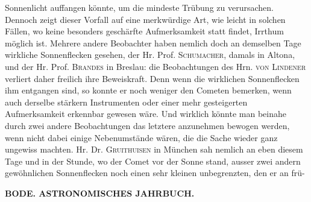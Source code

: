 Sonnenlicht auffangen könnte, um die mindeste Trübung zu verursachen. Dennoch zeigt dieser Vorfall auf eine merkwürdige Art, wie leicht in solchen Fällen, wo keine besonders geschärfte Aufmerksamkeit statt findet, Irrthum möglich ist. Mehrere andere Beobachter haben nemlich doch an demselben Tage wirkliche Sonnenflecken gesehen, der Hr. Prof. \textsc{Schumacher}, damals in Altona, und der Hr. Prof. \textsc{Brandes} in Breslau: die Beobachtungen des Hrn. \textsc{von Lindener} verliert daher freilich ihre Beweiskraft. Denn wenn die wirklichen Sonnenflecken ihm entgangen sind, so konnte er noch weniger den Cometen bemerken, wenn auch derselbe stärkern Instrumenten oder einer mehr gesteigerten Aufmerksamkeit erkennbar gewesen wäre. Und wirklich könnte man beinahe durch zwei andere Beobachtungen das letztere anzunehmen bewogen werden, wenn nicht dabei einige Nebenumstände wären, die die Sache wieder ganz ungewiss machten. Hr. Dr. \textsc{Gruithuisen} in München sah nemlich an eben diesem Tage und in der Stunde, wo der Comet vor der Sonne stand, ausser zwei andern gewöhnlichen Sonnenflecken noch einen sehr kleinen unbegrenzten, den er an frü-\par
\clearpage
{}
\noindent\makebox[10mm][l]{}%
\parbox[b]{\dimexpr\textwidth-20mm\relax}{\centering\small\textbf{BODE. ASTRONOMISCHES JAHRBUCH.}}%
\par\nobreak\medskip
